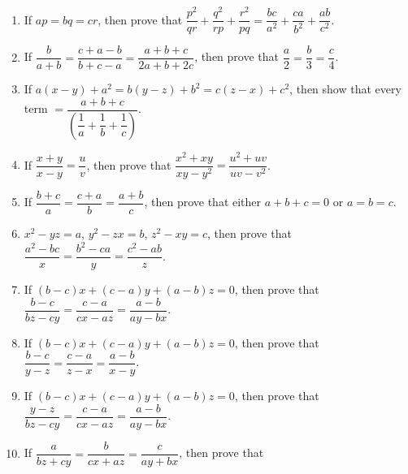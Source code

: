 \begin{enumerate}
            
            \item If $ap=bq=cr$, then prove that $\dfrac{p^2}{qr}+\dfrac{q^2}{rp}+\dfrac{r^2}{pq}=\dfrac{bc}{a^2}+\dfrac{ca}{b^2}+\dfrac{ab}{c^2}$.
            \item If $\dfrac{b}{a+b}=\dfrac{c+a-b}{b+c-a}=\dfrac{a+b+c}{2a+b+2c}$, then prove that $\dfrac{a}{2}=\dfrac{b}{3}=\dfrac{c}{4}$.
            \item If $a(x-y)+a^2=b(y-z)+b^2=c(z-x)+c^2$, then show that every term $=\dfrac{a+b+c}{\left(\dfrac{1}{a}+\dfrac{1}{b}+\dfrac{1}{c}\right)}$.
            \item If $\dfrac{x+y}{x-y}=\dfrac{u}{v}$, then prove that $\dfrac{x^2+xy}{xy-y^2}=\dfrac{u^2+uv}{uv-v^2}$.
            \item If $\dfrac{b+c}{a}=\dfrac{c+a}{b}=\dfrac{a+b}{c}$, then prove that either $a+b+c=0$ or $a=b=c$.






            \item $x^2-yz=a$, $y^2-zx=b$, $z^2-xy=c$, then prove that $\dfrac{a^2-bc}{x}=\dfrac{b^2-ca}{y}=\dfrac{c^2-ab}{z}$. %
            \item If $(b-c)x+(c-a)y+(a-b)z=0$, then prove that $\dfrac{b-c}{bz-cy}=\dfrac{c-a}{cx-az}=\dfrac{a-b}{ay-bx}$.
            \item If $(b-c)x+(c-a)y+(a-b)z=0$, then prove that $\dfrac{b-c}{y-z}=\dfrac{c-a}{z-x}=\dfrac{a-b}{x-y}$.
            \item If $(b-c)x+(c-a)y+(a-b)z=0$, then prove that $\dfrac{y-z}{bz-cy}=\dfrac{c-a}{cx-az}=\dfrac{a-b}{ay-bx}$.
            \item If $\dfrac{a}{bz+cy}=\dfrac{b}{cx+az}=\dfrac{c}{ay+bx}$, then prove that 




        \end{enumerate}
